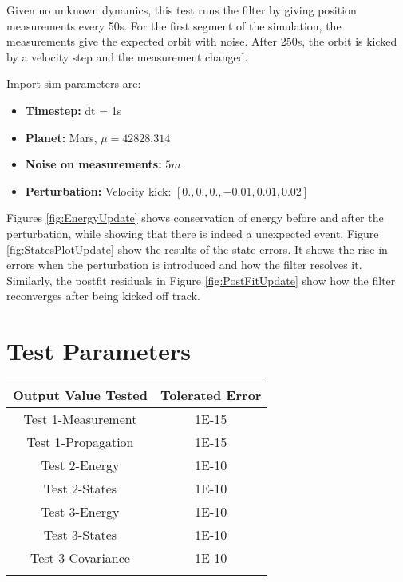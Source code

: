 Given no unknown dynamics, this test runs the filter by giving position measurements every 50s. For the first segment of the simulation, the measurements give the expected orbit with noise. After 250s, the orbit is kicked by a velocity step and the measurement changed.

Import sim parameters are:
\begin{itemize}
\item \textbf{Timestep:} dt = 1s
\item \textbf{Planet:} Mars, $\mu = 42828.314$
\item \textbf{Noise on measurements:} $5m$
\item \textbf{Perturbation:} Velocity kick: $\left[0.,0.,0.,-0.01, 0.01, 0.02\right]$
\end{itemize}

Figures \ref{fig:EnergyUpdate} shows conservation of energy before and after the perturbation, while showing that there is indeed a unexpected event. Figure \ref{fig:StatesPlotUpdate} show the results of the state errors. It shows the rise in errors when the perturbation is introduced and how the filter resolves it. Similarly, the postfit residuals in Figure \ref{fig:PostFitUpdate} show how the filter reconverges after being kicked off track.
 
 
 
 
\section{Test Parameters}

\begin{table}[ht]
\centering
\begin{tabular}{c|c}
\hline
\hline
\textbf{Output Value Tested}     & \textbf{Tolerated Error}  \\ \hline
Test 1-Measurement 	       & 1E-15      		             \\
Test 1-Propagation	               & 1E-15     	                  \\
Test 2-Energy  	                       & 1E-10    		                   \\
Test 2-States  	                       & 1E-10    		                   \\
Test 3-Energy  	                       & 1E-10    		                   \\
Test 3-States  	                       & 1E-10    		                   \\
Test 3-Covariance  	                       & 1E-10    		                   \\		     \\\hline
\end{tabular}
\end{table}

